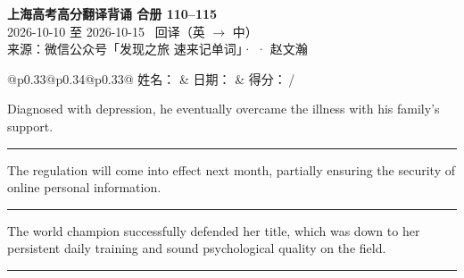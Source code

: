 \documentclass[11pt,a4paper]{article}
\newcommand{\num}[1]{\makebox[1.9em][r]{#1.}\hspace{0.3em}}
\newcommand{\wline}{\noindent\rule{\linewidth}{0.4pt}}
\begin{document}
\pagestyle{plain}
\begin{center}
{\LARGE\bfseries 上海高考高分翻译背诵 \quad 合册 110–115}\\[0.25em]
{\large 2026-10-10 至 2026-10-15 \quad\ 回译（英 $\to$ 中）}\\[0.35em]
{\footnotesize 来源：微信公众号「发现之旅 速来记单词」·  · 赵文瀚}
\end{center}

\vspace{0.4em}
\noindent\begin{tabular}{@{}p{0.33\textwidth}@{}p{0.34\textwidth}@{}p{0.33\textwidth}@{}}
姓名：\underline{\hspace{2.0cm}} & 日期：\underline{\hspace{2.0cm}} & 得分：\underline{\hspace{1.4cm}}\,/ \\
\end{tabular}

\vspace{0.5em}

\vspace{0.8em}
\vspace{0.35em}\vspace{0.15em}

\begin{minipage}{\linewidth}

\num{1}Diagnosed with depression, he eventually overcame the illness with his family’s support.

\vspace{0.25em}

\wline

\end{minipage}

\begin{minipage}{\linewidth}

\num{2}The regulation will come into effect next month, partially ensuring the security of online personal information.

\vspace{0.25em}

\wline

\end{minipage}

\begin{minipage}{\linewidth}

\num{3}The world champion successfully defended her title, which was down to her persistent daily training and sound psychological quality on the field.

\vspace{0.25em}

\wline

\end{minipage}
\end{document}
